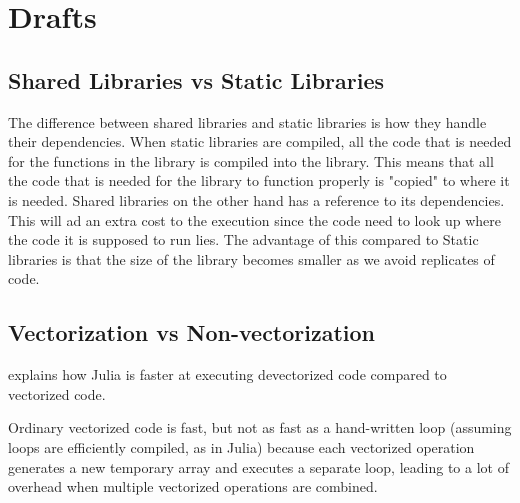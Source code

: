 \chapter{Drafts}
\section{Shared Libraries vs Static Libraries}
The difference between shared libraries and static libraries is how they handle their dependencies. When static libraries are compiled, all the code that is needed for the functions in the library is compiled into the library. This means that all the code that is needed for the library to function properly is "copied" to where it is needed. Shared libraries on the other hand has a reference to its dependencies. This will ad an extra cost to the execution since the code need to look up where the code it is supposed to run lies. The advantage of this compared to Static libraries is that the size of the library becomes smaller as we avoid replicates of code.


\section{Vectorization vs Non-vectorization}
\emph{\citep{Vectorization}} explains how Julia is faster at executing devectorized code compared to vectorized code.

\emph{\citep{MoreDotsJuliaBlog}}
Ordinary vectorized code is fast, but not as fast as a hand-written loop (assuming loops are efficiently compiled, as in Julia) because each vectorized operation generates a new temporary array and executes a separate loop, leading to a lot of overhead when multiple vectorized operations are combined.